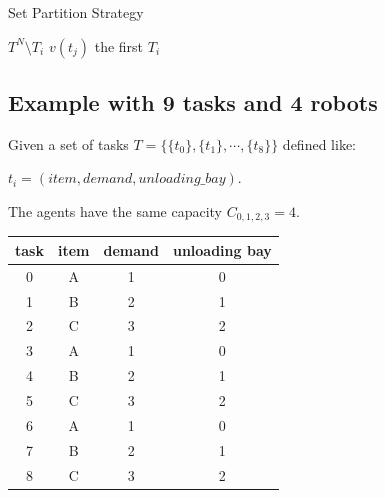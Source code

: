 \begin{algorithm}
  \caption{Set Partition Strategy} \label{SP}
  \begin{algorithmic}[1]
  \State {}
  $T^N \setminus T_i$
  \EndIf
      $v(t_j)$ 
    \EndFor
  \EndFor
   the first $T_i$
  \EndProcedure
  \end{algorithmic}
\end{algorithm}



\subsection*{Example with 9 tasks and 4 robots}
Given a set of tasks $T = \{  \{t_0\}, \{t_1\}, \cdots, \{t_8\} \}$ defined like:

${t_i=(item, demand, unloading\_bay)}$.

The agents have the same capacity $C_{0,1,2,3} = 4$.

\begin{center}
  \begin{tabular}{|c|c|c|c|} \hline
  \textbf{task} & \textbf{item} & \textbf{demand} & \textbf{unloading bay} \\ \hline
  0    & A    & 1      & 0             \\
  1    & B    & 2      & 1             \\
  2    & C    & 3      & 2             \\
  3    & A    & 1      & 0             \\
  4    & B    & 2      & 1             \\
  5    & C    & 3      & 2             \\
  6    & A    & 1      & 0             \\
  7    & B    & 2      & 1             \\
  8    & C    & 3      & 2             \\ \hline       
  \end{tabular}
\end{center}


